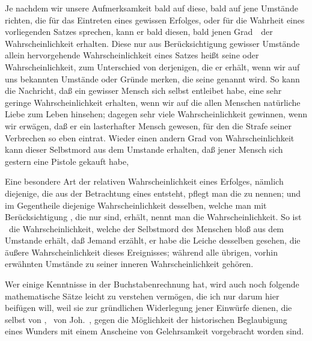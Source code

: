 \begin{aufza}
\item Je nachdem wir unsere Aufmerksamkeit bald auf diese, bald auf jene Umstände richten, die für das Eintreten eines gewissen Erfolges, oder für die Wahrheit eines vorliegenden Satzes sprechen, kann er bald diesen, bald jenen Grad~\ der Wahrscheinlichkeit erhalten. Diese nur aus Berücksichtigung gewisser Umstände allein hervorgehende Wahrscheinlichkeit eines Satzes heißt seine  oder  Wahrscheinlichkeit, zum Unterschied von derjenigen, die er erhält, wenn wir auf  uns bekannten Umstände oder Gründe merken, die seine  genannt wird. So kann die Nachricht, daß ein gewisser Mensch sich selbst entleibet habe, eine sehr geringe Wahrscheinlichkeit erhalten, wenn wir auf die allen Menschen natürliche Liebe zum Leben hinsehen; dagegen sehr viele Wahrscheinlichkeit gewinnen, wenn wir erwägen, daß er ein lasterhafter Mensch gewesen, für den die Strafe seiner Verbrechen so eben eintrat. Wieder einen andern Grad von Wahrscheinlichkeit kann dieser Selbstmord aus dem Umstande erhalten, daß jener Mensch sich gestern eine Pistole gekauft habe, \usw
\item Eine besondere Art der relativen Wahrscheinlichkeit eines Erfolges, nämlich diejenige, die aus der Betrachtung eines  entsteht, pflegt man die  zu nennen; und im Gegentheile diejenige Wahrscheinlichkeit desselben, welche man mit Berücksichtigung , die nur  sind, erhält, nennt man die  Wahrscheinlichkeit. So ist \zB\ die Wahrscheinlichkeit, welche der Selbstmord des Menschen bloß aus dem Umstande erhält, daß Jemand erzählt, er habe die Leiche desselben gesehen, die äußere Wahrscheinlichkeit dieses Ereignisses; während alle übrigen, vorhin erwähnten Umstände zu seiner inneren Wahrscheinlichkeit gehören.
\item Wer einige Kenntnisse in der Buchstabenrechnung hat, wird auch noch folgende mathematische Sätze leicht zu verstehen vermögen, die ich nur darum hier beifügen will, weil sie zur gründlichen Widerlegung jener Einwürfe dienen, die selbst von , \zB\ von Joh.~, gegen die Möglichkeit der historischen Beglaubigung eines Wunders mit einem Anscheine von Gelehrsamkeit vorgebracht worden sind.
\begin{aufzb}

\end{aufzb}
\end{aufza}
